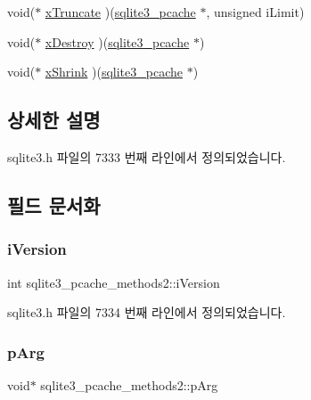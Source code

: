 \begin{DoxyCompactItemize}
\item 
void($\ast$ \hyperlink{structsqlite3__pcache__methods2_a711d60b1895622a10186a2894cef1383}{x\+Truncate} )(\hyperlink{sqlite3_8h_a096c453d937d51f7926d7d31c8e0bd2f}{sqlite3\+\_\+pcache} $\ast$, unsigned i\+Limit)
\item 
void($\ast$ \hyperlink{structsqlite3__pcache__methods2_a17a43db31d015c29e44d68c752682365}{x\+Destroy} )(\hyperlink{sqlite3_8h_a096c453d937d51f7926d7d31c8e0bd2f}{sqlite3\+\_\+pcache} $\ast$)
\item 
void($\ast$ \hyperlink{structsqlite3__pcache__methods2_a225971a193ff429d9f1339aca39c7755}{x\+Shrink} )(\hyperlink{sqlite3_8h_a096c453d937d51f7926d7d31c8e0bd2f}{sqlite3\+\_\+pcache} $\ast$)
\end{DoxyCompactItemize}


\subsection{상세한 설명}


sqlite3.\+h 파일의 7333 번째 라인에서 정의되었습니다.



\subsection{필드 문서화}
\mbox{\label{structsqlite3__pcache__methods2_a03b27be6c7cb8f1d2662c454cbe58483}} 
\subsubsection{\texorpdfstring{i\+Version}{iVersion}}
{\footnotesize\ttfamily int sqlite3\+\_\+pcache\+\_\+methods2\+::i\+Version}



sqlite3.\+h 파일의 7334 번째 라인에서 정의되었습니다.

\mbox{\label{structsqlite3__pcache__methods2_aee83131f16bb88218d7b0339854719d6}} 
\subsubsection{\texorpdfstring{p\+Arg}{pArg}}
{\footnotesize\ttfamily void$\ast$ sqlite3\+\_\+pcache\+\_\+methods2\+::p\+Arg}



